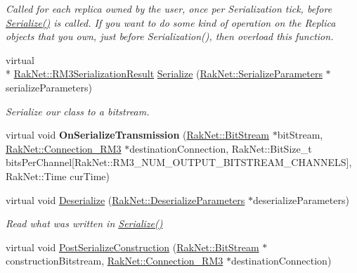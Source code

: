 \begin{DoxyCompactItemize}
\begin{DoxyCompactList}\small\item\em Called for each replica owned by the user, once per Serialization tick, before \hyperlink{class_rak_net_1_1_replica3_composite_abf66b82cf60d9c7d566ce8ade9cc17d3}{Serialize()} is called. If you want to do some kind of operation on the Replica objects that you own, just before Serialization(), then overload this function. \end{DoxyCompactList}\item 
virtual \\*
\hyperlink{group___r_e_p_l_i_c_a___m_a_n_a_g_e_r___g_r_o_u_p3_ga993da25eb23b67455e2438971c51429c}{Rak\-Net\-::\-R\-M3\-Serialization\-Result} \hyperlink{class_rak_net_1_1_replica3_composite_abf66b82cf60d9c7d566ce8ade9cc17d3}{Serialize} (\hyperlink{struct_rak_net_1_1_serialize_parameters}{Rak\-Net\-::\-Serialize\-Parameters} $\ast$serialize\-Parameters)
\begin{DoxyCompactList}\small\item\em Serialize our class to a bitstream. \end{DoxyCompactList}\item 
\hypertarget{class_rak_net_1_1_replica3_composite_a7633673ebb3b1559a58890e81ed4fdcf}{virtual void {\bfseries On\-Serialize\-Transmission} (\hyperlink{class_rak_net_1_1_bit_stream}{Rak\-Net\-::\-Bit\-Stream} $\ast$bit\-Stream, \hyperlink{class_rak_net_1_1_connection___r_m3}{Rak\-Net\-::\-Connection\-\_\-\-R\-M3} $\ast$destination\-Connection, Rak\-Net\-::\-Bit\-Size\-\_\-t bits\-Per\-Channel\mbox{[}Rak\-Net\-::\-R\-M3\-\_\-\-N\-U\-M\-\_\-\-O\-U\-T\-P\-U\-T\-\_\-\-B\-I\-T\-S\-T\-R\-E\-A\-M\-\_\-\-C\-H\-A\-N\-N\-E\-L\-S\mbox{]}, Rak\-Net\-::\-Time cur\-Time)}\label{class_rak_net_1_1_replica3_composite_a7633673ebb3b1559a58890e81ed4fdcf}

\item 
virtual void \hyperlink{class_rak_net_1_1_replica3_composite_a93bedef73e62c6893d47cd0482807f4c}{Deserialize} (\hyperlink{struct_rak_net_1_1_deserialize_parameters}{Rak\-Net\-::\-Deserialize\-Parameters} $\ast$deserialize\-Parameters)
\begin{DoxyCompactList}\small\item\em Read what was written in \hyperlink{class_rak_net_1_1_replica3_composite_abf66b82cf60d9c7d566ce8ade9cc17d3}{Serialize()} \end{DoxyCompactList}\item 
\hypertarget{class_rak_net_1_1_replica3_composite_a73424eca7c3bdd1140d82c2ee635fffe}{virtual void \hyperlink{class_rak_net_1_1_replica3_composite_a73424eca7c3bdd1140d82c2ee635fffe}{Post\-Serialize\-Construction} (\hyperlink{class_rak_net_1_1_bit_stream}{Rak\-Net\-::\-Bit\-Stream} $\ast$construction\-Bitstream, \hyperlink{class_rak_net_1_1_connection___r_m3}{Rak\-Net\-::\-Connection\-\_\-\-R\-M3} $\ast$destination\-Connection)}\label{class_rak_net_1_1_replica3_composite_a73424eca7c3bdd1140d82c2ee635fffe}


\end{DoxyCompactItemize}
